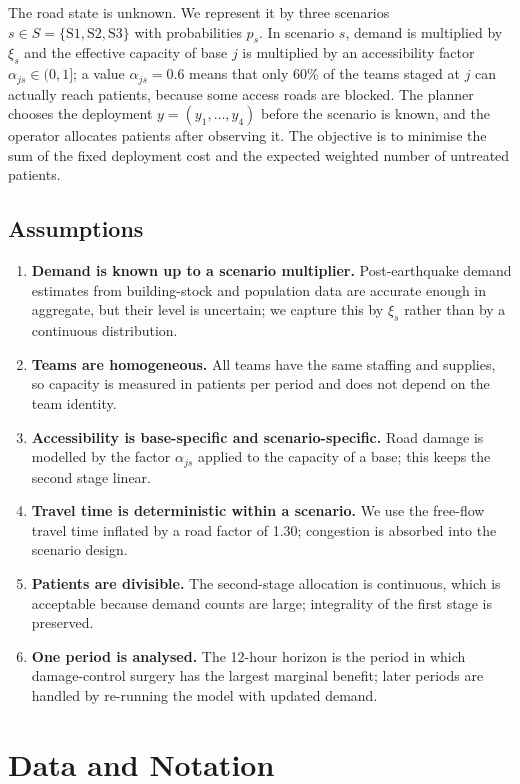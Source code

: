 \documentclass{apmcmthesis}
\begin{document}
The road state is unknown. We represent it by three scenarios $s\in S=\{\mathrm{S1},\mathrm{S2},\mathrm{S3}\}$ with probabilities $p_s$. In scenario $s$, demand is multiplied by $\xi_s$ and the effective capacity of base $j$ is multiplied by an accessibility factor $\alpha_{js}\in(0,1]$; a value $\alpha_{js}=0.6$ means that only 60\% of the teams staged at $j$ can actually reach patients, because some access roads are blocked. The planner chooses the deployment $y=(y_1,\dots,y_4)$ before the scenario is known, and the operator allocates patients after observing it. The objective is to minimise the sum of the fixed deployment cost and the expected weighted number of untreated patients.

\subsection{Assumptions}

\begin{enumerate}
\item \textbf{Demand is known up to a scenario multiplier.} Post-earthquake demand estimates from building-stock and population data are accurate enough in aggregate, but their level is uncertain; we capture this by $\xi_s$ rather than by a continuous distribution.
\item \textbf{Teams are homogeneous.} All teams have the same staffing and supplies, so capacity is measured in patients per period and does not depend on the team identity.
\item \textbf{Accessibility is base-specific and scenario-specific.} Road damage is modelled by the factor $\alpha_{js}$ applied to the capacity of a base; this keeps the second stage linear.
\item \textbf{Travel time is deterministic within a scenario.} We use the free-flow travel time inflated by a road factor of 1.30; congestion is absorbed into the scenario design.
\item \textbf{Patients are divisible.} The second-stage allocation is continuous, which is acceptable because demand counts are large; integrality of the first stage is preserved.
\item \textbf{One period is analysed.} The 12-hour horizon is the period in which damage-control surgery has the largest marginal benefit; later periods are handled by re-running the model with updated demand.
\end{enumerate}

\section{Data and Notation}
\end{document}
